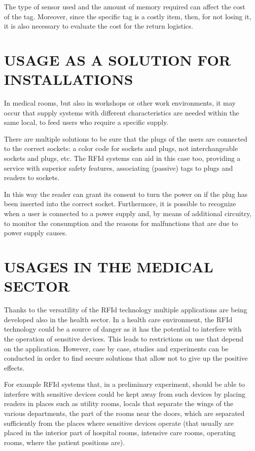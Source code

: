 \vspace*{1pc}
The type of sensor used and the amount of memory required can affect the cost of the tag. Moreover, since the specific tag is a costly item, then, for not losing it, it is also necessary to evaluate the cost for the return logistics. 

\section[USAGE AS A SOLUTION FOR INSTALLATIONS]{\fontsize{14}{12}\selectfont USAGE AS A SOLUTION FOR INSTALLATIONS}
In medical rooms, but also in workshops or other work environments, it may occur that supply systems with different characteristics are needed within the same local, to feed users who require a specific supply.

\vspace*{1pc} 
There are multiple solutions to be sure that the plugs of the users are connected to the correct sockets: a color code for sockets and plugs, not interchangeable sockets and plugs, etc. The RFId systems can aid in this case too, providing a service with superior safety features, associating (passive) tags to plugs and readers to sockets. 

\vspace*{1pc}
In this way the reader can grant its consent to turn the power on if the plug has been inserted into the correct socket. Furthermore, it is possible to recognize when a user is connected to a power supply and, by means of additional circuitry, to monitor the consumption and the reasons for malfunctions that are due to power supply causes. 
 
\section[USAGES IN THE MEDICAL SECTOR]{\fontsize{14}{12}\selectfont USAGES IN THE MEDICAL SECTOR}
Thanks to the versatility of the RFId technology multiple applications are being developed also in the health sector. In a health care environment, the RFId technology could be a source of danger as it has the potential to interfere with the operation of sensitive devices. This leads to restrictions on use that depend on the application. However, case by case, studies and experiments can be conducted in order to find secure solutions that allow not to give up the positive effects. 

\vspace*{1pc}
For example RFId systems that, in a preliminary experiment, should be able to interfere with sensitive devices could be kept away from such devices by placing readers in places such as utility rooms, locals that separate the wings of the various departments, the part of the rooms near the doors, which are separated sufficiently from the places where sensitive devices operate (that usually are placed in the interior part of hospital rooms, intensive care rooms, operating rooms, where the patient positions are). 

